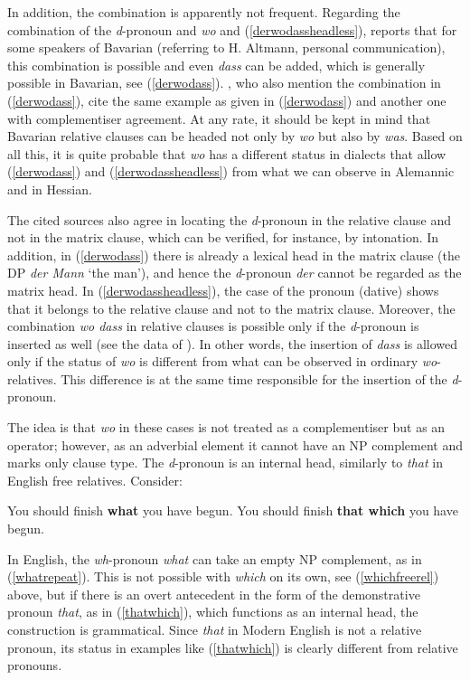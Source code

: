 In addition, the combination is apparently not frequent. Regarding the combination of the \textit{d}-pronoun and \textit{wo} and (\ref{derwodassheadless}), \citet[781]{weiss2013} reports that for some speakers of Bavarian (referring to H. Altmann, personal communication), this combination is possible and even \textit{dass} can be added, which is generally possible in Bavarian, see (\ref{derwodass}). \citet{grewendorfpoletto2015}, who also mention the combination in (\ref{derwodass}), cite the same example as given in (\ref{derwodass}) and another one with complementiser agreement. At any rate, it should be kept in mind that Bavarian relative clauses can be headed not only by \textit{wo} but also by \textit{was}. Based on all this, it is quite probable that \textit{wo} has a different status in dialects that allow (\ref{derwodass}) and (\ref{derwodassheadless}) from what we can observe in Alemannic and in Hessian.

The cited sources also agree in locating the \textit{d}-pronoun in the relative clause and not in the matrix clause, which can be verified, for instance, by intonation. In addition, in (\ref{derwodass}) there is already a lexical head in the matrix clause (the DP \textit{der Mann} `the man'), and hence the \textit{d}-pronoun \textit{der} cannot be regarded as the matrix head. In (\ref{derwodassheadless}), the case of the pronoun (dative) shows that it belongs to the relative clause and not to the matrix clause. Moreover, the combination \textit{wo dass} in relative clauses is possible only if the \textit{d}-pronoun is inserted as well (see the data of \citealt[781]{weiss2013}). In other words, the insertion of \textit{dass} is allowed only if the status of \textit{wo} is different from what can be observed in ordinary \textit{wo}-relatives. This difference is at the same time responsible for the insertion of the \textit{d}-pronoun.

The idea is that \textit{wo} in these cases is not treated as a complementiser but as an operator; however, as an adverbial element it cannot have an NP complement and marks only clause type. The \textit{d}-pronoun is an internal head, similarly to \textit{that} in English free relatives. Consider:

\ea
\ea You should finish \textbf{what} you have begun. \label{whatrepeat}
\ex You should finish \textbf{that which} you have begun. \label{thatwhich}
\z
\z

In English, the \textit{wh}-pronoun \textit{what} can take an empty NP complement, as in (\ref{whatrepeat}). This is not possible with \textit{which} on its own, see (\ref{whichfreerel}) above, but if there is an overt antecedent in the form of the demonstrative pronoun \textit{that}, as in (\ref{thatwhich}), which functions as an internal head, the construction is grammatical. Since \textit{that} in Modern English is not a relative pronoun, its status in examples like (\ref{thatwhich}) is clearly different from relative pronouns.

